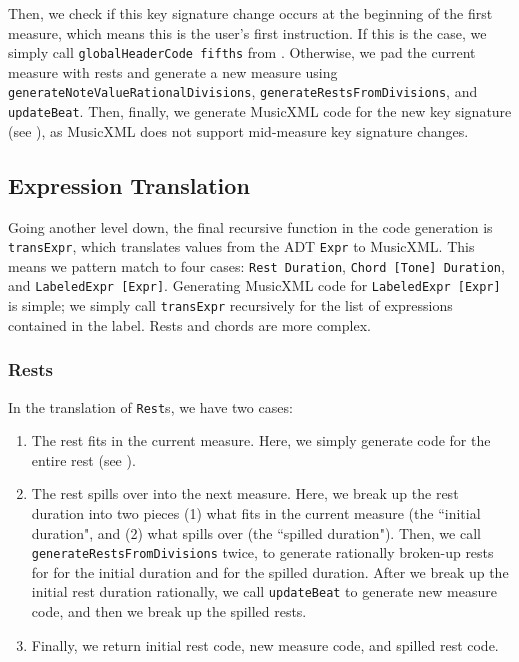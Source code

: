 \documentclass{report}
\begin{document}
Then, we check if this key signature change occurs at the beginning of the first measure, which means this is the user's first instruction. If this is the case, we simply call \verb.globalHeaderCode fifths. from . Otherwise, we pad the current measure with rests and generate a new measure using \verb.generateNoteValueRationalDivisions., \verb.generateRestsFromDivisions., and \verb.updateBeat.. Then, finally, we generate MusicXML code for the new key signature (see ), as MusicXML does not support mid-measure key signature changes. 

\subsection{Expression Translation}

Going another level down, the final recursive function in the code generation is \verb.transExpr., which translates values from the ADT \verb.Expr. to MusicXML. This means we pattern match to four cases: \verb.Rest Duration., \verb.Chord [Tone] Duration., and \verb.LabeledExpr [Expr].. Generating MusicXML code for \verb.LabeledExpr [Expr]. is simple; we simply call \verb.transExpr. recursively for the list of expressions contained in the label. Rests and chords are more complex.

\subsubsection{Rests}

In the translation of \verb.Rest.s, we  have two cases:
\begin{enumerate}
\item The rest fits in the current measure. Here, we simply generate code for the entire rest (see ).

\item The rest spills over into the next measure. Here, we break up the rest duration into two pieces (1) what fits in the current measure (the ``initial duration", and (2) what  spills over (the ``spilled duration"). Then, we call \verb.generateRestsFromDivisions. twice, to generate rationally broken-up rests for for the initial duration and for the spilled duration. After we break up the initial rest duration rationally, we call \verb.updateBeat. to generate new measure code, and then we break up the spilled rests. 

\item Finally, we return initial rest code, new measure code, and spilled rest code. 
\end{enumerate}
\end{document}
